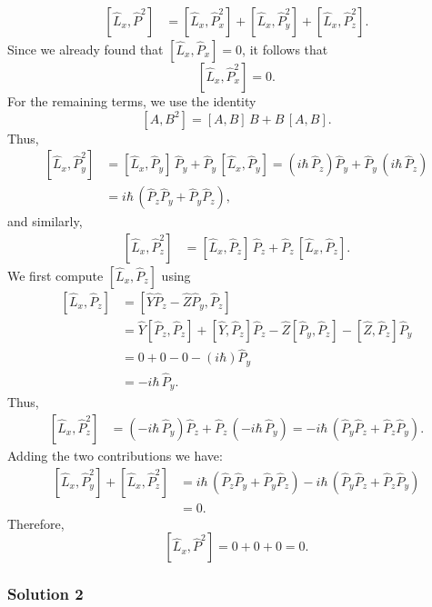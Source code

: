 \documentclass{article}
\begin{document}
\[
\begin{aligned}
[\hat{L}_x, \hat{P}^2] &= [\hat{L}_x, \hat{P}_x^2] + [\hat{L}_x, \hat{P}_y^2] + [\hat{L}_x, \hat{P}_z^2].
\end{aligned}
\]
Since we already found that \([\hat{L}_x, \hat{P}_x] = 0\), it follows that
\[
[\hat{L}_x, \hat{P}_x^2] = 0.
\]
For the remaining terms, we use the identity
\[
[A, B^2] = [A,B]\,B + B\,[A,B].
\]
Thus,
\[
\begin{aligned}
[\hat{L}_x, \hat{P}_y^2] &= [\hat{L}_x, \hat{P}_y]\,\hat{P}_y + \hat{P}_y\,[\hat{L}_x, \hat{P}_y]
= (i\hbar\,\hat{P}_z)\hat{P}_y + \hat{P}_y\,(i\hbar\,\hat{P}_z)\\[1mm]
&= i\hbar\,(\hat{P}_z\hat{P}_y+\hat{P}_y\hat{P}_z),
\end{aligned}
\]
and similarly,
\[
\begin{aligned}
[\hat{L}_x, \hat{P}_z^2] &= [\hat{L}_x, \hat{P}_z]\,\hat{P}_z + \hat{P}_z\,[\hat{L}_x, \hat{P}_z].
\end{aligned}
\]
We first compute \([\hat{L}_x, \hat{P}_z]\) using
\[
\begin{aligned}
[\hat{L}_x, \hat{P}_z] &= [\hat{Y}\hat{P}_z - \hat{Z}\hat{P}_y, \hat{P}_z]\\[1mm]
&= \hat{Y}[\hat{P}_z,\hat{P}_z] + [\hat{Y},\hat{P}_z]\hat{P}_z - \hat{Z}[\hat{P}_y,\hat{P}_z] - [\hat{Z},\hat{P}_z]\hat{P}_y\\[1mm]
&= 0 + 0 - 0 - (i\hbar)\hat{P}_y\\[1mm]
&= -i\hbar\,\hat{P}_y.
\end{aligned}
\]
Thus,
\[
\begin{aligned}
[\hat{L}_x, \hat{P}_z^2] &= (-i\hbar\,\hat{P}_y)\hat{P}_z + \hat{P}_z\,(-i\hbar\,\hat{P}_y)
= -i\hbar\,(\hat{P}_y\hat{P}_z+\hat{P}_z\hat{P}_y).
\end{aligned}
\]
Adding the two contributions we have:
\[
\begin{aligned}
[\hat{L}_x, \hat{P}_y^2] + [\hat{L}_x, \hat{P}_z^2] &= i\hbar\,(\hat{P}_z\hat{P}_y+\hat{P}_y\hat{P}_z) - i\hbar\,(\hat{P}_y\hat{P}_z+\hat{P}_z\hat{P}_y)\\[1mm]
&= 0.
\end{aligned}
\]
Therefore,
\[
[\hat{L}_x, \hat{P}^2] = 0 + 0 + 0 = 0.
\]

\subsubsection{Solution 2}
\end{document}
